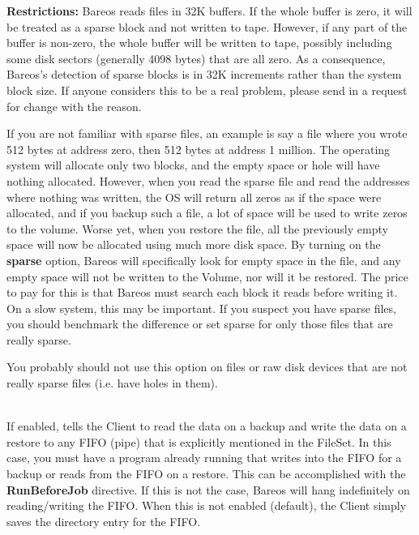 \begin{description}
   {\bf Restrictions:} Bareos reads files in 32K buffers.  If the whole
   buffer is zero, it will be treated as a sparse block and not written to
   tape.  However, if any part of the buffer is non-zero, the whole buffer
   will be written to tape, possibly including some disk sectors (generally
   4098 bytes) that are all zero.  As a consequence, Bareos's detection of
   sparse blocks is in 32K increments rather than the system block size.
   If anyone considers this to be a real problem, please send in a request
   for change with the reason.

   If you are not familiar with sparse files, an example is say a file
   where you wrote 512 bytes at address zero, then 512 bytes at address 1
   million.  The operating system will allocate only two blocks, and the
   empty space or hole will have nothing allocated.  However, when you read
   the sparse file and read the addresses where nothing was written, the OS
   will return all zeros as if the space were allocated, and if you backup
   such a file, a lot of space will be used to write zeros to the volume.
   Worse yet, when you restore the file, all the previously empty space
   will now be allocated using much more disk space.  By turning on the
   {\bf sparse} option, Bareos will specifically look for empty space in
   the file, and any empty space will not be written to the Volume, nor
   will it be restored.  The price to pay for this is that Bareos must
   search each block it reads before writing it.  On a slow system, this
   may be important.  If you suspect you have sparse files, you should
   benchmark the difference or set sparse for only those files that are
   really sparse.

   You probably should not use this option on files or raw disk devices
   that are not really sparse files (i.e. have holes in them).

\label{readfifo}
\item [readfifo=yes{\textbar}no] \hfill \\
   If enabled, tells the Client to read the data on a backup and write the
   data on a restore to any FIFO (pipe) that is explicitly mentioned in the
   FileSet.  In this case, you must have a program already running that
   writes into the FIFO for a backup or reads from the FIFO on a restore.
   This can be accomplished with the {\bf RunBeforeJob} directive.  If this
   is not the case, Bareos will hang indefinitely on reading/writing the
   FIFO. When this is not enabled (default), the Client simply saves the
   directory entry for the FIFO.


\end{description}
